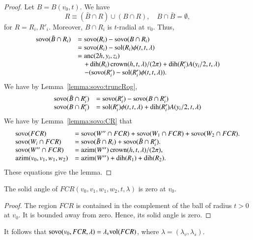\begin{proof}
Let $B = B(v_0,t)$.  We have
$$R\equiv (\bar B\cap R) \cup (B\cap R),\quad B\cap \bar B = \emptyset,
$$
for $R=R_i,R'_i$.  Moreover, $B\cap R_i$ is $t$-radial at $v_0$.
Thus, 
 $$
\begin{array}{lll}
 {\operatorname{sovo}}(\bar B\cap R_i) &= {\operatorname{sovo}}(R_i) - {\operatorname{sovo}}(B\cap R_i)\\
 &= {\operatorname{sovo}}(R_i) - \operatorname{sol}(R_i)\phi(t,t,\lambda) \\
 &= {\operatorname{anc}}(2h,y_i,z_i) \\
    &\quad + \operatorname{dih}(R_i)\operatorname{crown}(h,t,\lambda)/(2\pi) + \operatorname{dih}(R'_i) A(y_i/2,t,\lambda)\\
  &\quad -({\operatorname{sovo}}(R_i') -\operatorname{sol}(R_i')\phi(t,t,\lambda)). \\
\end{array}
 $$
We have by Lemma~\ref{lemma:sovo:truncRog}, 
$$
\begin{array}{lll}
{\operatorname{sovo}}(\bar B\cap R_i') &= {\operatorname{sovo}}(R'_i) - {\operatorname{sovo}}(B\cap R'_i)\\
{\operatorname{sovo}}(B\cap R'_i) &= \operatorname{sol}(R'_i)\phi(t,t,\lambda) + \operatorname{dih}(R'_i) A(y_i/2,t,\lambda)\\
\end{array}
$$
We have by Lemma~\ref{lemma:sovo:CR} that
$$
\begin{array}{lll}
{\operatorname{sovo}}(FCR) &= {\operatorname{sovo}}(W''\cap FCR) + {\operatorname{sovo}}(W_1\cap FCR)
 +{\operatorname{sovo}}(W_2\cap FCR).\\
{\operatorname{sovo}}(W_i\cap FCR) &= {\operatorname{sovo}}(\bar B\cap R_i) + {\operatorname{sovo}}(\bar B\cap R'_i).\\
 {\operatorname{sovo}}(W''\cap FCR) &= {\operatorname{azim}}(W'')\operatorname{crown}(h,t,\lambda)/(2\pi),\\
{\operatorname{azim}}(v_0,v_1,w_1,w_2)&= {\operatorname{azim}}(W'')+\operatorname{dih}(R_1)+\operatorname{dih}(R_2).\\
\end{array}
$$
These equations give the lemma.
\end{proof}

\begin{lemma}  The solid angle of $FCR(v_0,v_1,w_1,w_2,t,\lambda)$
is zero at $v_0$.
\end{lemma}

\begin{proof}  The region $FCR$ is contained in the complement
of the ball of radius $t>0$ at $v_0$.  It is bounded away from
zero.  Hence, its solid angle is zero.
\end{proof}

It follows that ${\operatorname{sovo}}(v_0,FCR,\lambda) = \lambda_v{\operatorname{vol}}(FCR)$,
where $\lambda=(\lambda_v,\lambda_s)$.



